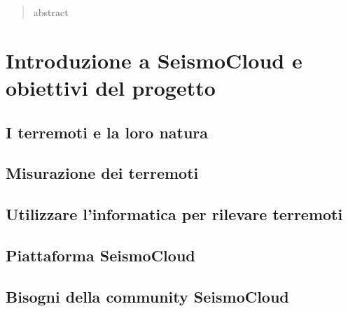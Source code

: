 \documentclass[a4paper,10pt]{memoir}
\begin{document}
\frontmatter


\maketitle
\cleardoublepage


\begin{abstract}
	abstract
\end{abstract}
\cleardoublepage

\tableofcontents
\cleardoublepage

\mainmatter

\renewcommand\chapterheadstart{}
\renewcommand\printchaptername{}
\renewcommand\chapternamenum{}
\renewcommand\printchapternum{}
\renewcommand\afterchapternum{}
\renewcommand\printchaptertitle[1]{\chaptitlefont \thechapter. \space #1}


\chapter{Introduzione a SeismoCloud e obiettivi del progetto}

\section{I terremoti e la loro natura}

\section{Misurazione dei terremoti}

\section{Utilizzare l'informatica per rilevare terremoti}

\section{Piattaforma SeismoCloud}

\section{Bisogni della community SeismoCloud}
\end{document}
